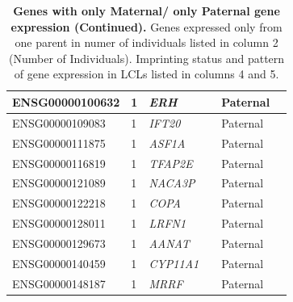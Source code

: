 \begin{table}
\begin{adjustbox}{width={\textwidth}}
\begin{tabular}{@{}p{4cm}p{3cm}p{3cm}p{3cm}p{3cm}p{3cm}@{}}
ENSG00000100632 & 1 & \emph{ERH} & &  Paternal &   \\ \hline
ENSG00000109083 & 1 & \emph{IFT20} & &  Paternal &  \\ \hline
ENSG00000111875 & 1 & \emph{ASF1A} & &  Paternal &   \\ \hline
ENSG00000116819 & 1 & \emph{TFAP2E} & &  Paternal &   \\ \hline
ENSG00000121089 & 1 & \emph{NACA3P} & &  Paternal &   \\ \hline
ENSG00000122218 & 1 & \emph{COPA}& &  Paternal &   \\ \hline
ENSG00000128011 & 1 & \emph{LRFN1} & &  Paternal &   \\ \hline
ENSG00000129673 & 1 & \emph{AANAT} & & Paternal  & \\ \hline
ENSG00000140459 & 1 & \emph{CYP11A1} & &  Paternal &   \\ \hline
ENSG00000148187 & 1 & \emph{MRRF} & &  Paternal &   \\ \hline
\end{tabular}
\end{adjustbox}
\caption[]{\textbf{Genes with only Maternal/ only Paternal gene expression (Continued).  }Genes expressed only from one parent in numer of individuals listed in column 2 (Number of Individuals). Imprinting status and pattern of gene expression in LCLs listed in columns 4 and 5.}
\label{tab:oneparentexpression2}
\end{table}


